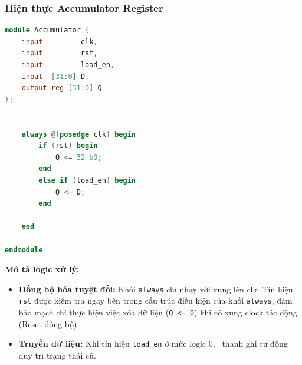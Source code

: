 \subsubsection{Hiện thực Accumulator Register}


\begin{lstlisting}[language=Verilog, caption={Accumulator Register}, label={lst:accum_code}]
module Accumulator (
    input         clk,        
    input         rst,        
    input         load_en,    
    input  [31:0] D,          
    output reg [31:0] Q     
);

    
    always @(posedge clk) begin
        if (rst) begin
            Q <= 32'b0;          
        end 
        else if (load_en) begin
            Q <= D;              
        end
        
    end

endmodule
\end{lstlisting}

\textbf{Mô tả logic xử lý:}
\begin{itemize}
    \item \textbf{Đồng bộ hóa tuyệt đối:} Khối \texttt{always} chỉ nhạy với xung lên clk. 
    Tín hiệu \texttt{rst} được kiểm tra ngay bên trong cấu trúc điều kiện của khối \texttt{always}, 
    đảm bảo mạch chỉ thực hiện việc xóa dữ liệu (\texttt{Q <= 0}) khi có xung clock tác động (Reset đồng bộ).
    \item \textbf{Truyền dữ liệu:} Khi tín hiệu \texttt{load\_en} ở mức logic 0, \
    thanh ghi tự động duy trì trạng thái cũ.
\end{itemize}